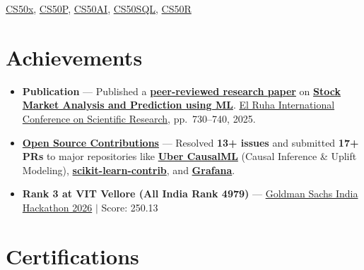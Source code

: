\documentclass[a4paper,10pt]{article}
\newcommand{\ulink}[2]{\href{#1}{#2}}
\begin{document}
{\color[HTML]{3A3A3A}\fontsize{11}{14}\selectfont \ulink{https://cs50.harvard.edu/certificates/b14b78df-e05c-413e-a607-1dd27303053a}{CS50x}, \ulink{https://cs50.harvard.edu/certificates/32477052-9db4-49c4-a5a4-d7e58429ca2c}{CS50P}, \ulink{https://cs50.harvard.edu/certificates/9cdb4d4a-1250-4f8e-9fd7-191864e0f919}{CS50AI}, \ulink{https://cs50.harvard.edu/certificates/bc486f24-f085-4e61-8536-80940b97a1b9}{CS50SQL}, \ulink{https://cs50.harvard.edu/certificates/666838e6-a053-4d82-b179-a60fe745fd84}{CS50R} \\[2pt]


\section{Achievements}
\vspace{2pt}

\begin{itemize}[nosep, leftmargin=1.5em, itemsep=2pt, topsep=2pt]
  \item {\color[HTML]{0A0A0A}\fontsize{11}{14}\selectfont \textbf{Publication} --- Published a \ulink{https://www.elruha.org/_files/ugd/614b1f_6b95e1b697bf452b9907ba46e0151c05.pdf\#page=774}{\textbf{peer-reviewed research paper}} on \ulink{https://github.com/su-jin1425/Set-Project}{\textbf{Stock Market Analysis and Prediction using ML}}. \ulink{https://www.elruha.org/congress-books}{El Ruha International Conference on Scientific Research}, pp.\ 730--740, 2025.}
  \item {\color[HTML]{0A0A0A}\fontsize{11}{14}\selectfont \textbf{\ulink{https://github.com/su-jin1425/My-Open-Source-Contributions}{Open Source Contributions}} --- Resolved \textbf{13+ issues} and submitted \textbf{17+ PRs} to major repositories like \ulink{https://github.com/uber/causalml}{\textbf{Uber CausalML}} (Causal Inference \& Uplift Modeling), \ulink{https://github.com/scikit-learn-contrib/forest-confidence-interval}{\textbf{scikit-learn-contrib}}, and \ulink{https://github.com/grafana/alloy-scenarios}{\textbf{Grafana}}.}
  \item {\color[HTML]{0A0A0A}\fontsize{11}{14}\selectfont \textbf{Rank 3 at VIT Vellore (All India Rank 4979)} --- \ulink{https://www.hackerrank.com/contests/goldman-sachs-india-hackathon-2026-cs/leaderboard}{Goldman Sachs India Hackathon 2026} $|$ Score: 250.13}
\end{itemize}

\section{Certifications}
\vspace{2pt}

}
\end{document}
